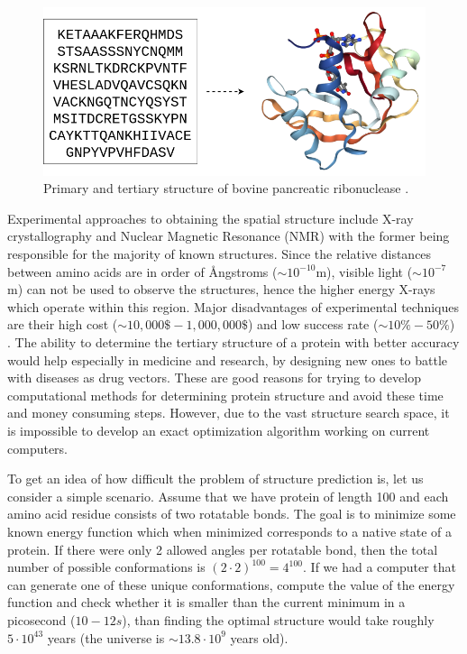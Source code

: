 \begin{figure}[b!]
    \centering
    \includegraphics[width=\linewidth]{imgs_tomas/bopaen2.png}
    \caption{Primary and tertiary structure of bovine pancreatic ribonuclease \cite{pdb}.}
    \label{fig:primarytertiary}
\end{figure}

Experimental approaches to obtaining the spatial structure include X-ray crystallography and Nuclear Magnetic Resonance (NMR) with the former being responsible for the majority of known structures. 
Since the relative distances between amino acids are in order of \AA ngstroms ($\sim10^{-10}$m), visible light ($\sim10^{-7}$m) can not be used to observe the structures, hence the higher energy X-rays which operate within this region. 
Major disadvantages of experimental techniques are their high cost ($\sim 10,000\mathdollar-1,000,000\mathdollar$) and low success rate ($\sim 10\%-50\%$) \cite{protcost}.
The ability to determine the tertiary structure of a protein with better accuracy would help especially in medicine and research, by designing new ones to battle with diseases as drug vectors.
These are good reasons for trying to develop computational methods for determining protein structure and avoid these time and money consuming steps.
However, due to the vast structure search space, it is impossible to develop an exact optimization algorithm working on current computers.

To get an idea of how difficult the problem of structure prediction is, let us consider a simple scenario. 
Assume that we have protein of length 100 and each amino acid residue consists of two rotatable bonds. 
The goal is to minimize some known energy function which when minimized corresponds to a native state of a protein.
If there were only 2 allowed angles per rotatable bond, then the total number of possible conformations is $(2\cdot2)^{100} = 4^{100}$. 
If we had a computer that can generate one of these unique conformations, compute the value of the energy function and check whether it is smaller than the current minimum in a picosecond ($10-{12} s$), than finding the optimal structure would take roughly $5 \cdot 10^{43}$ years (the universe is $\sim 13.8\cdot10^9$ years old).

